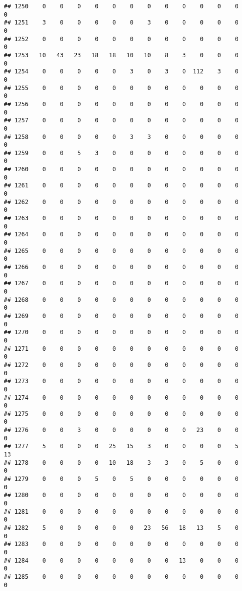 \documentclass[]{article}
\begin{document}
\begin{verbatim}
## 1250    0    0    0    0    0    0    0    0    0    0    0    0    0
## 1251    3    0    0    0    0    0    3    0    0    0    0    0    0
## 1252    0    0    0    0    0    0    0    0    0    0    0    0    0
## 1253   10   43   23   18   18   10   10    8    3    0    0    0    0
## 1254    0    0    0    0    0    3    0    3    0  112    3    0    0
## 1255    0    0    0    0    0    0    0    0    0    0    0    0    0
## 1256    0    0    0    0    0    0    0    0    0    0    0    0    0
## 1257    0    0    0    0    0    0    0    0    0    0    0    0    0
## 1258    0    0    0    0    0    3    3    0    0    0    0    0    0
## 1259    0    0    5    3    0    0    0    0    0    0    0    0    0
## 1260    0    0    0    0    0    0    0    0    0    0    0    0    0
## 1261    0    0    0    0    0    0    0    0    0    0    0    0    0
## 1262    0    0    0    0    0    0    0    0    0    0    0    0    0
## 1263    0    0    0    0    0    0    0    0    0    0    0    0    0
## 1264    0    0    0    0    0    0    0    0    0    0    0    0    0
## 1265    0    0    0    0    0    0    0    0    0    0    0    0    0
## 1266    0    0    0    0    0    0    0    0    0    0    0    0    0
## 1267    0    0    0    0    0    0    0    0    0    0    0    0    0
## 1268    0    0    0    0    0    0    0    0    0    0    0    0    0
## 1269    0    0    0    0    0    0    0    0    0    0    0    0    0
## 1270    0    0    0    0    0    0    0    0    0    0    0    0    0
## 1271    0    0    0    0    0    0    0    0    0    0    0    0    0
## 1272    0    0    0    0    0    0    0    0    0    0    0    0    0
## 1273    0    0    0    0    0    0    0    0    0    0    0    0    0
## 1274    0    0    0    0    0    0    0    0    0    0    0    0    0
## 1275    0    0    0    0    0    0    0    0    0    0    0    0    0
## 1276    0    0    3    0    0    0    0    0    0   23    0    0    0
## 1277    5    0    0    0   25   15    3    0    0    0    0    5   13
## 1278    0    0    0    0   10   18    3    3    0    5    0    0    0
## 1279    0    0    0    5    0    5    0    0    0    0    0    0    0
## 1280    0    0    0    0    0    0    0    0    0    0    0    0    0
## 1281    0    0    0    0    0    0    0    0    0    0    0    0    0
## 1282    5    0    0    0    0    0   23   56   18   13    5    0    0
## 1283    0    0    0    0    0    0    0    0    0    0    0    0    0
## 1284    0    0    0    0    0    0    0    0   13    0    0    0    0
## 1285    0    0    0    0    0    0    0    0    0    0    0    0    0

\end{verbatim}
\end{document}
